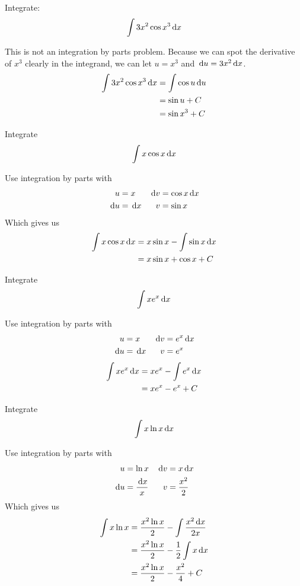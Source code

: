 \begin{ex}
  Integrate:
  \[
    \int 3x^2 \cos x^3 \,\mathrm{d} x
    \]
  \begin{sol}
    This is not an integration by parts problem.
    Because we can spot the derivative of $x^3$ clearly in the integrand,
    we can let $u=x^3$ and $\,\mathrm{d} u = 3x^2 \,\mathrm{d} x$.
    \begin{align*}
      \int 3x^2 \cos x^3 \,\mathrm{d} x & = \int \cos u \,\mathrm{d} u \\
      &= \sin u +C\\
      &= \sin {x^3}+C
    \end{align*}
  \end{sol}
\end{ex}
\begin{ex}
  Integrate
  \[
    \int x \cos x \,\mathrm{d} x
    \]
    \begin{sol}
      Use integration by parts with
      \begin{align*}
        u &= x & \,\mathrm{d} v &= \cos x \,\mathrm{d} x \\
        \,\mathrm{d} u &= \,\mathrm{d} x & v &= \sin x
      \end{align*}
      Which gives us
      \begin{align*}
        \int x \cos x \,\mathrm{d} x &= x \sin x - \int \sin x \,\mathrm{d} x \\
        &= x \sin x + \cos x +C
      \end{align*}
    \end{sol}
\end{ex}
\begin{ex}
  Integrate
  \[
    \int x e^x \,\mathrm{d} x
    \]
    \begin{sol}
      Use integration by parts with
      \begin{align*}
        u&=x & \,\mathrm{d} v &= e^x \,\mathrm{d} x \\
        \,\mathrm{d} u &= \,\mathrm{d} x & v &= e^x
      \end{align*}
      \begin{align*}
        \int x e^x \,\mathrm{d} x &= x e^x -\int e^x \,\mathrm{d} x \\
        &=x e^x -e^x +C
      \end{align*}
    \end{sol}
\end{ex}
\begin{ex}
  Integrate
  \[
    \int x \ln x \,\mathrm{d} x
    \]
  \begin{sol}
    Use integration by parts with
    \begin{align*}
      u&= \ln x & \,\mathrm{d} v &= x \,\mathrm{d} x \\
      \,\mathrm{d} u &= \frac{\,\mathrm{d} x}{x} & v &= \frac{x^2}{2}
    \end{align*}
    Which gives us
    \begin{align*}
      \int x \ln x &= \frac{x^2 \ln x}{2}- \int \frac{x^2 \,\mathrm{d} x}{2x} \\
      &= \frac{x^2 \ln x}{2}-\frac{1}{2} \int x \,\mathrm{d} x \\
      &= \frac{x^2 \ln x}{2}-\frac{x^2}{4}+C
    \end{align*}
  \end{sol}
\end{ex}
